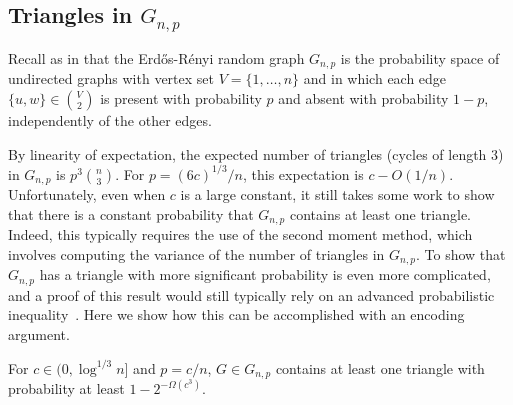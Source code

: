 \documentclass[format=acmsmall, review=false, screen=true]{acmart}
\begin{document}
\subsection{Triangles in $G_{n,p}$}

Recall as in  that the Erd\H{o}s-R\'{e}nyi random graph
$G_{n,p}$ is the probability space of undirected graphs with vertex set
$V=\{1,\ldots,n\}$ and in which each edge $\{u, w\} \in \binom{V}{2}$
is present with probability $p$ and absent with probability $1-p$,
independently of the other edges.

By linearity of expectation, the expected number of triangles (cycles of 
length 3) 
in $G_{n,p}$ is $p^3\binom{n}{3}$.  For $p=(6c)^{1/3}/n$, this
expectation is $c-O(1/n)$.  Unfortunately, even when $c$ is a large
constant, it still takes some work to show that there is a constant
probability that $G_{n,p}$ contains at least one triangle. Indeed,
this typically requires the use of the second moment method, which
involves computing the variance of the number of triangles in
$G_{n,p}$. To show that $G_{n, p}$ has a triangle with more
significant probability is even more complicated,
 and a proof of this result would still typically rely on an
advanced probabilistic inequality~\cite{alon:probabilistic}. Here we
show how this can be accomplished with an encoding argument.

\begin{thm}
  For $c \in (0, \log^{1/3} n]$ and 
  $p=c/n$, $G \in G_{n,p}$ contains at least one 
  triangle with
  probability at least $1-2^{-\varOmega(c^3)}$.
\end{thm}
\end{document}
